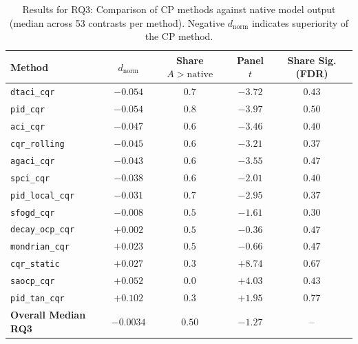 \begin{table}[htbp]
  \centering
  \caption{Results for RQ3: Comparison of CP methods against native model output (median across 53 contrasts per method). Negative $d_{\text{norm}}$ indicates superiority of the CP method.}
  \label{tab:rq3_results}
  \begin{tabular}{l c c c c}
    \toprule
    \textbf{Method} & $d_{\text{norm}}$ & \textbf{Share } $A > \text{native}$ & \textbf{Panel } $t$ & \textbf{Share Sig. (FDR)} \\
    \midrule
    \texttt{dtaci\_cqr}     & $-0.054$ & $0.7$ & $-3.72$ & $0.43$ \\
    \texttt{pid\_cqr}       & $-0.054$ & $0.8$ & $-3.97$ & $0.50$ \\
    \texttt{aci\_cqr}       & $-0.047$ & $0.6$ & $-3.46$ & $0.40$ \\
    \texttt{cqr\_rolling}   & $-0.045$ & $0.6$ & $-3.21$ & $0.37$ \\
    \texttt{agaci\_cqr}     & $-0.043$ & $0.6$ & $-3.55$ & $0.47$ \\
    \texttt{spci\_cqr}      & $-0.038$ & $0.6$ & $-2.01$ & $0.40$ \\
    \texttt{pid\_local\_cqr}& $-0.031$ & $0.7$ & $-2.95$ & $0.37$ \\
    \midrule
    \texttt{sfogd\_cqr}     & $-0.008$ & $0.5$ & $-1.61$ & $0.30$ \\
    \texttt{decay\_ocp\_cqr}& $+0.002$ & $0.5$ & $-0.36$ & $0.47$ \\
    \texttt{mondrian\_cqr}  & $+0.023$ & $0.5$ & $-0.66$ & $0.47$ \\
    \midrule
    \texttt{cqr\_static}    & $+0.027$ & $0.3$ & $+8.74$ & $0.67$ \\
    \texttt{saocp\_cqr}     & $+0.052$ & $0.0$ & $+4.03$ & $0.43$ \\
    \texttt{pid\_tan\_cqr}   & $+0.102$ & $0.3$ & $+1.95$ & $0.77$ \\
    \midrule
    \textbf{Overall Median RQ3} & $-0.0034$ & $0.50$ & $-1.27$ & -- \\
    \bottomrule
  \end{tabular}
\end{table}

